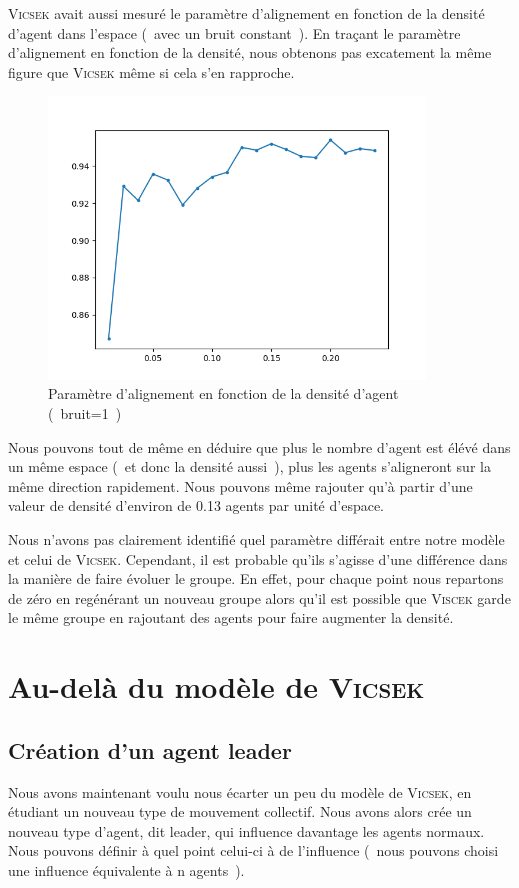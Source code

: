\documentclass[french, a4paper, 12pt, openany]{report}
\begin{document}
    \textsc{Vicsek} avait aussi mesuré le paramètre d'alignement en fonction de la densité d'agent dans l'espace (~avec un bruit constant~). En traçant le paramètre d'alignement en fonction de la densité, nous obtenons pas excatement la même figure que \textsc{Vicsek} même si cela s'en rapproche.
      
       \begin{figure}[!h]
		\centering
		\includegraphics[width=10cm]{images/densite_1[noise=1].png}
		\caption{Paramètre d'alignement en fonction de la densité d'agent (~bruit=1~)}
		\label{densité_alignement}
	\end{figure}
	
	Nous pouvons tout de même en déduire que plus le nombre d'agent est élévé dans un même espace (~et donc la densité aussi~), plus les agents s'aligneront sur la même direction rapidement. Nous pouvons même rajouter qu'à partir d'une valeur de densité d'environ de 0.13 agents par unité d'espace. 
	
	Nous n'avons pas clairement identifié quel paramètre différait entre notre modèle et celui de \textsc{Vicsek}. Cependant, il est probable qu'ils s'agisse d'une différence dans la manière de faire évoluer le groupe. En effet, pour chaque point nous repartons de zéro en regénérant un nouveau groupe alors qu'il est possible que \textsc{Viscek} garde le même groupe en rajoutant des agents pour faire augmenter la densité.
    \newpage
    \section{Au-delà du modèle de \textsc{Vicsek}}
    \subsection{Création d'un agent leader}
       Nous avons maintenant voulu nous écarter un peu du modèle de \textsc{Vicsek}, en étudiant un nouveau type de mouvement collectif. Nous avons alors crée un nouveau type d'agent, dit leader, qui influence davantage les agents normaux. Nous pouvons définir à quel point celui-ci à de l'influence (~nous pouvons choisi une influence équivalente à n agents~).\\
       
\end{document}
